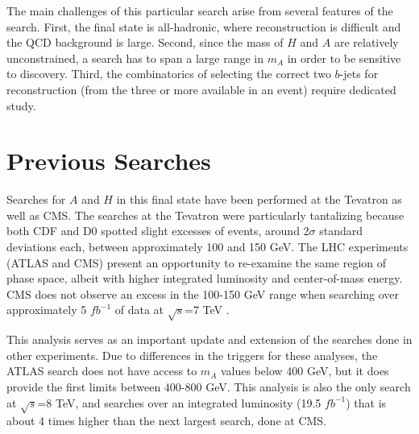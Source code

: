 The main challenges of this particular search arise from several features of the search.  
First, the final state is all-hadronic, where reconstruction is difficult and 
the QCD background is large.  Second, since the mass of $H$ 
and $A$ are relatively unconstrained, a search has to span a large 
range in $m_A$ in order to be sensitive to discovery.  
Third, the combinatorics of selecting the correct two $b$-jets for reconstruction 
(from the three or more available in an event) require dedicated study.  


\section{Previous Searches}
Searches for $A$ and $H$ in this final state have been performed at the Tevatron
as well as CMS.  The searches at the 
Tevatron were particularly tantalizing because both CDF \cite{CDFbH} and D0 \cite{D0bH} spotted 
slight excesses of events, around 2$\sigma$ standard deviations each, between approximately
100 and 150 GeV.  The LHC experiments (ATLAS and CMS) present an opportunity to
re-examine the same region of phase space, albeit with higher integrated luminosity
and center-of-mass energy.  CMS does not observe an excess in the 100-150 GeV range 
when searching over approximately 5 $fb^{-1}$ of data at $\sqrt{s}$=7 TeV \cite{CMSbH}.

This analysis serves as an important update and extension of the searches done
in other experiments.  Due to differences in the triggers for these analyses,
the ATLAS search does not have access to $m_A$ values below 400 GeV, but it does 
provide the first limits between 400-800 GeV.  This analysis is also the only
search at $\sqrt{s}$=8 TeV, and searches over an integrated luminosity (19.5 $fb^{-1}$)
that is about 4 times higher than the next largest search, done at CMS.


 






